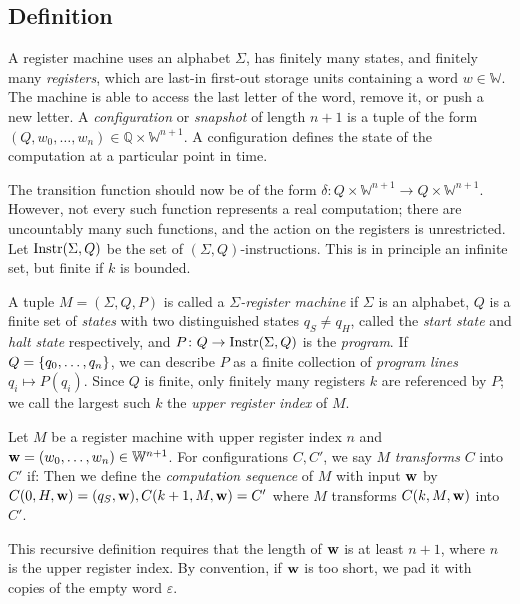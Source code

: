 \subsection{Definition}
A register machine uses an alphabet \( \Sigma \), has finitely many states, and finitely many \emph{registers}, which are last-in first-out storage units containing a word \( w \in \mathbb W \).
The machine is able to access the last letter of the word, remove it, or push a new letter.
A \emph{configuration} or \emph{snapshot} of length \( n+1 \) is a tuple of the form \( (Q, w_0, \dots, w_n) \in \mathbb Q \times \mathbb W^{n+1} \).
A configuration defines the state of the computation at a particular point in time.

The transition function should now be of the form \( \delta \colon Q \times \mathbb W^{n+1} \to Q \times \mathbb W^{n+1} \).
However, not every such function represents a real computation; there are uncountably many such functions, and the action on the registers is unrestricted.
Let \( \operatorname{Instr}(\Sigma, Q) \) be the set of \( (\Sigma,Q) \)-instructions.
This is in principle an infinite set, but finite if \( k \) is bounded.
\begin{definition}
	A tuple \( M = (\Sigma, Q, P) \) is called a \emph{\( \Sigma \)-register machine} if \( \Sigma \) is an alphabet, \( Q \) is a finite set of \emph{states} with two distinguished states \( q_S \neq q_H \), called the \emph{start state} and \emph{halt state} respectively, and \( P \colon Q \to \operatorname{Instr}(\Sigma,Q) \) is the \emph{program}.
	If \( Q = \qty{q_0, \dots, q_n} \), we can describe \( P \) as a finite collection of \emph{program lines} \( q_i \mapsto P(q_i) \).
	Since \( Q \) is finite, only finitely many registers \( k \) are referenced by \( P \); we call the largest such \( k \) the \emph{upper register index} of \( M \).
\end{definition}
\begin{definition}
	Let \( M \) be a register machine with upper register index \( n \) and \( \vb w = (w_0, \dots, w_n) \in \mathbb W^{n+1} \).
	For configurations \( C, C' \), we say \( M \) \emph{transforms} \( C \) into \( C' \) if:
	Then we define the \emph{computation sequence} of \( M \) with input \( \vb w \) by \( C(0,H,\vb w) = (q_S,\vb w), C(k+1,M,\vb w) = C' \) where \( M \) transforms \( C(k,M,\vb w) \) into \( C' \).
\end{definition}
\begin{remark}
	This recursive definition requires that the length of \( \vb w \) is at least \( n + 1 \), where \( n \) is the upper register index.
	By convention, if \( \vb w \) is too short, we pad it with copies of the empty word \( \varepsilon \).
\end{remark}
